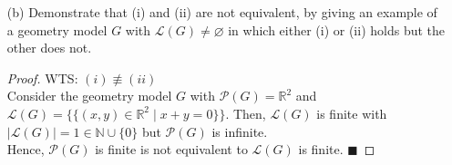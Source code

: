 \documentclass[a4paper, 10pt]{exam}
\begin{document}
\begin{questions}
\begin{enumerate}
\begin{proof}
           Indeed, $\mathscr{P} (G)$ is finite is equivalent to $\mathscr{P}(G) \cup \mathscr{L} (G)$ is finite. $\blacksquare$
        \end{proof}
      \item[(b)] Demonstrate that (i) and (ii) are not equivalent, by giving an example of a geometry model $G$ with $\mathscr{L}(G) \neq \varnothing$ in which either (i) or (ii) holds but the other does not.
        \begin{proof}
            WTS: $(i) \not\equiv (ii)$ \\
            Consider the geometry model $G$ with $\mathscr{P} (G) = \mathbb{R}^2$ and $\mathscr{L} (G) =\{\{(x,y) \in \mathbb{R}^2 \mid x + y = 0 \}\}$. Then, $\mathscr{L} (G)$ is finite with $|\mathscr{L} (G)| = 1 \in \mathbb{N} \cup \{0\}$ but $\mathscr{P} (G)$ is infinite. \\
             
            Hence, $\mathscr{P} (G)$ is finite is not equivalent to $\mathscr{L} (G)$ is finite. $\blacksquare$
        \end{proof}

    \end{enumerate}
    
\end{questions}
\end{document}
